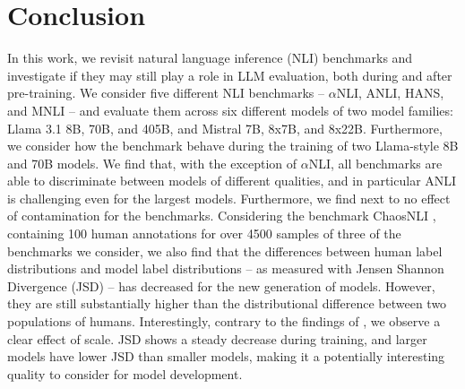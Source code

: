 \section{Conclusion}

In this work, we revisit natural language inference (NLI) benchmarks and investigate if they may still play a role in LLM evaluation, both during and after pre-training.
We consider five different NLI benchmarks -- $\alpha$NLI, ANLI, HANS, and MNLI -- and evaluate them across six different models of two model families: Llama 3.1 8B, 70B, and 405B, and Mistral 7B, 8x7B, and 8x22B.
Furthermore, we consider how the benchmark behave during the training of two Llama-style 8B and 70B models.
We find that, with the exception of $\alpha$NLI, all benchmarks are able to discriminate between models of different qualities, and in particular ANLI is challenging even for the largest models.
Furthermore, we find next to no effect of contamination for the benchmarks.
Considering the benchmark ChaosNLI \citep{nie-etal-2020-learn}, containing 100 human annotations for over 4500 samples of three of the benchmarks we consider, we also find that the differences between human label distributions and model label distributions -- as measured with Jensen Shannon Divergence (JSD) -- has decreased for the new generation of models.
However, they are still substantially higher than the distributional difference between two populations of humans. 
Interestingly, contrary to the findings of \citet{nie-etal-2020-learn}, we observe a clear effect of scale.
JSD shows a steady decrease during training, and larger models have lower JSD than smaller models, making it a potentially interesting quality to consider for model development.
